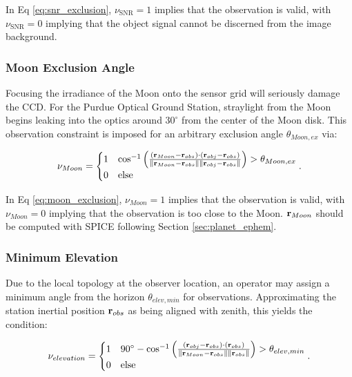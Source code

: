 In Eq \ref{eq:snr_exclusion}, $\nu_{\mathrm{SNR}} = 1$ implies that the observation is valid, with $\nu_{\mathrm{SNR}} = 0$ implying that the object signal cannot be discerned from the image background.

\subsubsection{Moon Exclusion Angle}

Focusing the irradiance of the Moon onto the sensor grid will seriously damage the CCD. For the Purdue Optical Ground Station, straylight from the Moon begins leaking into the optics around $30^\circ$ from the center of the Moon disk. This observation constraint is imposed for an arbitrary exclusion angle $\theta_{Moon,ex}$ via:

\begin{equation} \label{eq:moon_exclusion}
  \nu_{Moon} = \begin{cases}
    1 & \cos^{-1}\left( \frac{\left( \mathbf{r}_{Moon} - \mathbf{r}_{obs} \right) \cdot \left( \mathbf{r}_{obj} - \mathbf{r}_{obs} \right)}{\| \mathbf{r}_{Moon} - \mathbf{r}_{obs} \| \| \mathbf{r}_{obj} - \mathbf{r}_{obs} \|} \right) > \theta_{Moon,ex}\\
    0 & \mathrm{else}
  \end{cases}.
\end{equation}

In Eq \ref{eq:moon_exclusion}, $\nu_{Moon} = 1$ implies that the observation is valid, with $\nu_{Moon} = 0$ implying that the observation is too close to the Moon. $\mathbf{r}_{Moon}$ should be computed with SPICE following Section \ref{sec:planet_ephem}.

\subsubsection{Minimum Elevation}

Due to the local topology at the observer location, an operator may assign a minimum angle from the horizon $\theta_{elev,min}$ for observations. Approximating the station inertial position $\mathbf{r}_{obs}$ as being aligned with zenith, this yields the condition:


\begin{equation} \label{eq:elevation_exclusion}
  \nu_{elevation} = \begin{cases}
    1 & 90^\circ - \cos^{-1}\left( \frac{\left( \mathbf{r}_{obj} - \mathbf{r}_{obs} \right) \cdot \left( \mathbf{r}_{obs} \right)}{\| \mathbf{r}_{Moon} - \mathbf{r}_{obs} \| \| \mathbf{r}_{obs} \|} \right) > \theta_{elev,min}\\
    0 & \mathrm{else}
  \end{cases}.
\end{equation}


